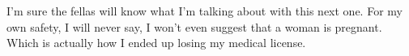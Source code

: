 \item I'm sure the fellas will know what I'm talking about with this
  next one. For my own safety, I will never say, I won't even suggest
  that a woman is pregnant. Which is actually how I ended up losing my
  medical license.